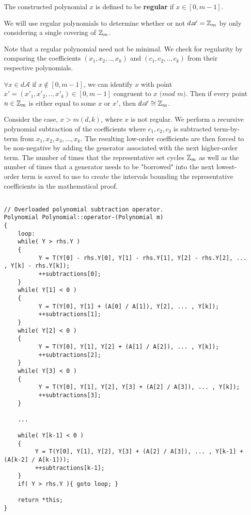 \begin{proposition}
The constructed polynomial $x$ is defined to be \textbf{regular} if $x \in [0, m-1]$.
\end{proposition}
We will use regular polynomials to determine whether or not $d \mathscr{A} = \mbox{$\mathbb Z$}_m$ by only considering a single covering of $\mbox{$\mathbb Z$}_m$.\n

\noindent
Note that a regular polynomial need not be minimal.\n
\noindent
We check for regularity by comparing the coefficients $(x_1, x_2, .. , x_{k})$ and $(c_1, c_2, .. , c_k)$ from their respective polynomials.\n

\begin{proposition}
$\forall x \in d \mathscr{A}$ if $x \notin [0, m-1]$, we can identify $x$ with point $x' = (x'_1, x'_2, .. , x'_k) \in [0, m-1]$ congruent to $x$ $(mod$ $m)$.  Then if every point $n \in \mbox{$\mathbb Z$}_m$ is either equal to some $x$ or $x'$, then $d \mathscr{A} \cong \mbox{$\mathbb Z$}_m$.\n
\end{proposition}

\noindent
Consider the case, $x > m(d, k)$, where $x$ is not regular. We perform a recursive polynomial subtraction of the coefficients where $c_1, c_2, c_3$ is subtracted term-by-term from $x_1, x_2, x_3, ... , x_k$. The resulting low-order coefficients are then forced to be non-negative by adding the generator associated with the next higher-order term.\n
The number of times that the representative set cycles $\mbox{$\mathbb Z$}_m$ as well as the number of times that a generator needs to be "borrowed" into the next lowest-order term is saved to use to create the intervals bounding the representative coefficients in the mathematical proof.

\begin{lstlisting}

// Overloaded polynomial subtraction operator.
Polynomial Polynomial::operator-(Polynomial m)
{
    loop:
    while( Y > rhs.Y )
    {
          Y = T(Y[0] - rhs.Y[0], Y[1] - rhs.Y[1], Y[2] - rhs.Y[2], ... , Y[k] - rhs.Y[k]);
          ++subtractions[0];
    }
    while( Y[1] < 0 )
    {
          Y = T(Y[0], Y[1] + (A[0] / A[1]), Y[2], ... , Y[k]);
          ++subtractions[1];
    }
    while( Y[2] < 0 )
    {
          Y = T(Y[0], Y[1], Y[2] + (A[1] / A[2]), ... , Y[k]);
          ++subtractions[2];
    }
    while( Y[3] < 0 )
    {
          Y = T(Y[0], Y[1], Y[2], Y[3] + (A[2] / A[3]), ... , Y[k]);
          ++subtractions[3];
    }

    ...

    while( Y[k-1] < 0 )
    {
         Y = T(Y[0], Y[1], Y[2], Y[3] + (A[2] / A[3]), ... , Y[k-1] + (A[k-2] / A[k-1]));
         ++subtractions[k-1];
    }
    if( Y > rhs.Y ){ goto loop; } 

    return *this;
}
\end{lstlisting}

